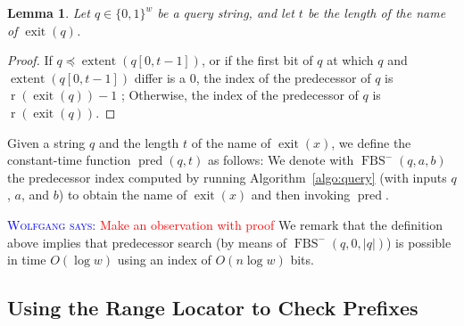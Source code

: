 \documentclass[a4paper,11pt]{article}
\newtheorem{lemma}[theorem]{Lemma}
\newcommand{\?}{\mskip1.5mu}
\DeclareMathOperator{\exit}{exit}
\DeclareMathOperator{\rrange}{r}
\DeclareMathOperator{\extent}{extent}
\DeclareMathOperator{\pred}{pred}
\DeclareMathOperator{\fbs}{FBS}
\newcommand{\aremark}[3]{\textcolor{blue}{\textsc{#1 #2:}}
  \textcolor{red}{\textsf{#3}}}
\newcommand{\wolfgang}[2][says]{\aremark{Wolfgang}{#1}{#2}}
\begin{document}
\begin{lemma}
Let $q \in \{0, 1\}^w$ be a query string, and
let $t$ be the length of the name of $\exit(q)$.
\end{lemma}
\begin{proof}
  If $q \preceq \extent(q[0, t - 1])$, or if the first bit of 
    $q$ at which $q$ and $\extent(q[0, t-1])$ differ is a $0$, 
    the index of the predecessor of $q$ is $\rrange(\exit(q))-1$ ;
  Otherwise, the index of the predecessor of $q$ is 
    $\rrange(\exit(q))$.
\end{proof}
Given a string $q$ and the length $t$ of the name of $\exit(x)$, 
we define the constant-time function $\pred(q, t)$
as follows:
 We denote with $\fbs^-(q,a,b)$ the predecessor index computed by 
 running Algorithm~\ref{algo:query} (with inputs $q$, $a$, and $b$) 
 to obtain the name of $\exit(x)$ and then invoking $\pred$.


\wolfgang{Make an observation with proof}
We remark that the definition above implies that predecessor search
(by means of $\fbs^-(q,0,|q|)$) is possible in time $O(\log w)$ 
using an index of $O(n\log w)$ bits.

\subsection{Using the Range Locator to Check Prefixes}
\end{document}
